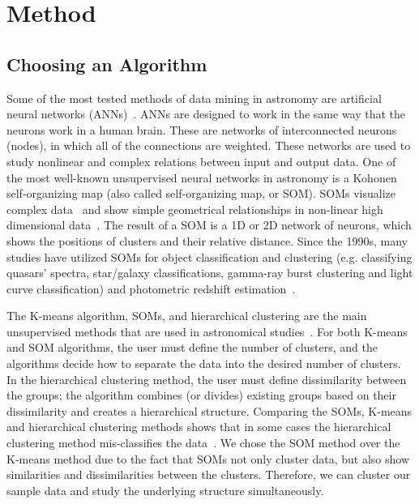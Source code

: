 \section{Method}
\label{sec: method_SOMN}
\subsection{Choosing an Algorithm}

Some of the most tested methods of data mining in astronomy are artificial neural networks (ANNs)~\citep[e.g.][and references therein]{Hossein14,Hossein16}.
ANNs are designed to work in the same way that the neurons work in a human brain.
These are networks of interconnected neurons (nodes), in which all of the connections are weighted.
These networks are used to study nonlinear and complex relations between input and output data.
One of the most well-known unsupervised neural networks in astronomy is a Kohonen self-organizing map (also called self-organizing map, or SOM).
SOMs visualize complex data~\citep{Kohonen82} and show simple geometrical relationships in non-linear high dimensional data~\citep{Kohonen98}.
The result of a SOM is a 1D or 2D network of neurons, which shows the positions of clusters and their relative distance.
Since the 1990s, many studies have utilized SOMs for object classification and clustering (e.g. classifying quasars' spectra, star/galaxy classifications, gamma-ray burst clustering and light curve classification) and photometric redshift estimation~\citep[e.g.][]{Odewahn92, Hernandez94, Murtagh95, Maehoenen95,Scaringi09,Geach12,Fustes13,Meusinger16,Rahmani16b}.

The K-means algorithm, SOMs, and hierarchical clustering are the main unsupervised methods that are used in astronomical studies~\citep[e.g.][]{DAbrusco12, Aycha16}.
For both K-means and SOM algorithms, the user must define the number of clusters, and the algorithms decide how to separate the data into the desired number of clusters.
In the hierarchical clustering method, the user must define dissimilarity between the groups; the algorithm combines (or divides) existing groups based on their dissimilarity and creates a hierarchical structure. 
Comparing the SOMs, K-means and hierarchical clustering methods shows that in some cases the hierarchical clustering method mis-classifies the data~\citep[][and references therein]{Mangiameli96}.
We chose the SOM method over the K-means method due to the fact that SOMs not only cluster data, but also show similarities and dissimilarities between the clusters.
Therefore, we can cluster our sample data and study the underlying structure simultaneously.

